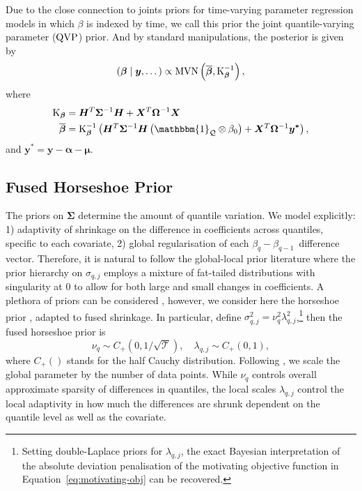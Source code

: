 %
Due to the close connection to joints priors for time-varying parameter regression models in which $\beta$ is indexed by time, we call this prior the joint quantile-varying parameter ($\operatorname{QVP}$) prior.
%
And by standard manipulations, the posterior is given by
%
\begin{equation} \label{eq:Posterior_beta_centred}
    \left(\boldsymbol{\beta} \mid \boldsymbol{y},\dotsc\right) \propto \mathrm{MVN}\left(\overline{\boldsymbol{\beta}}, \boldsymbol{\text{K}_{\beta}}^{-1}\right),
\end{equation}
%
where
%
\begin{equation}
    \begin{split}
        \boldsymbol{\text{K}_{\beta}} & = \boldsymbol{H}^T\boldsymbol{\Sigma}^{-1}\boldsymbol{H} + \boldsymbol{X}^T\boldsymbol{\Omega}^{-1}\boldsymbol{X} \\
        \overline{\boldsymbol{\beta}} & = \boldsymbol{\text{K}_{\beta}}^{-1} \left(\boldsymbol{H}^T\boldsymbol{\Sigma}^{-1}\boldsymbol{H}\left(\mathbbm{1}_{\mathcal{Q}} \otimes \beta_0\right) + \boldsymbol{X}^T\boldsymbol{\Omega}^{-1}\boldsymbol{y^{*}}\right), 
    \end{split}
\end{equation}
and $\boldsymbol{y^{*}}  =  \boldsymbol{y} - \boldsymbol{\alpha} - \boldsymbol{\mu}$.
%
\subsection{Fused Horseshoe Prior}
%
The priors on $\boldsymbol{\Sigma}$ determine the amount of quantile variation. We model explicitly: 1) adaptivity of shrinkage on the difference in coefficients across quantiles, specific to each covariate, 2) global regularisation of each $\beta_q-\beta_{q-1}$~difference vector. Therefore, it is natural to follow the global-local prior literature where the prior hierarchy on $\sigma_{q,j}$ employs a mixture of fat-tailed distributions with singularity at 0 to allow for both large and small changes in coefficients. A plethora of priors can be considered \citep{polson_half-cauchy_2012}, however, we consider here the horseshoe prior \citep{carvalho_handling_2009}, adapted to fused shrinkage. In particular, define $\sigma^2_{q,j} = \nu_q^2\lambda_{q,j}^2$,\footnote{Setting double-Laplace priors for $\lambda_{q,j}$, the exact Bayesian interpretation of the absolute deviation penalisation of the motivating objective function in Equation~\ref{eq:motivating-obj} can be recovered.} then the fused horseshoe prior is
%
\begin{equation}\label{eq:prior-differences-centred}
    \nu_q\sim C_{+}\left(0,1/\sqrt{\mathcal{T}}\right),\quad \lambda_{q,j}\sim C_{+}(0,1),
\end{equation}
%
where $C_+()$ stands for the half Cauchy distribution. Following \citet{piironen_hyperprior_2017}, we scale the global parameter by the number of data points. While $\nu_q$ controls overall approximate sparsity of differences in quantiles, the local scales $\lambda_{q,j}$ control the local adaptivity in how much the differences are shrunk dependent on the quantile level as well as the covariate.
%
